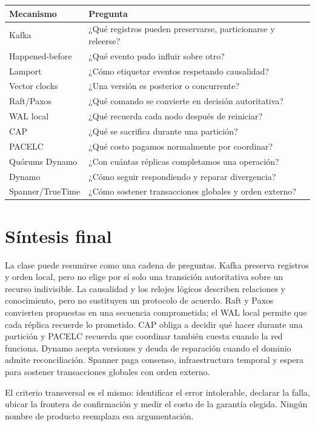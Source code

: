 \documentclass[variant=apuntes,cover=institutional,mode=screen]{ua-engineering-v6-article}
\begin{document}
\begin{longtable}{p{}p{}}
\toprule
\textbf{Mecanismo} & \textbf{Pregunta}\\
\midrule
Kafka & ¿Qué registros pueden preservarse, particionarse y releerse?\\
Happened-before & ¿Qué evento pudo influir sobre otro?\\
Lamport & ¿Cómo etiquetar eventos respetando causalidad?\\
Vector clocks & ¿Una versión es posterior o concurrente?\\
Raft/Paxos & ¿Qué comando se convierte en decisión autoritativa?\\
WAL local & ¿Qué recuerda cada nodo después de reiniciar?\\
CAP & ¿Qué se sacrifica durante una partición?\\
PACELC & ¿Qué costo pagamos normalmente por coordinar?\\
Quórums Dynamo & ¿Con cuántas réplicas completamos una operación?\\
Dynamo & ¿Cómo seguir respondiendo y reparar divergencia?\\
Spanner/TrueTime & ¿Cómo sostener transacciones globales y orden externo?\\
\bottomrule
\end{longtable}

\section{Síntesis final}

La clase puede resumirse como una cadena de preguntas. Kafka preserva registros y orden local, pero no elige por sí solo una transición autoritativa sobre un recurso indivisible. La causalidad y los relojes lógicos describen relaciones y conocimiento, pero no sustituyen un protocolo de acuerdo. Raft y Paxos convierten propuestas en una secuencia comprometida; el WAL local permite que cada réplica recuerde lo prometido. CAP obliga a decidir qué hacer durante una partición y PACELC recuerda que coordinar también cuesta cuando la red funciona. Dynamo acepta versiones y deuda de reparación cuando el dominio admite reconciliación. Spanner paga consenso, infraestructura temporal y espera para sostener transacciones globales con orden externo.

El criterio transversal es el mismo: identificar el error intolerable, declarar la falla, ubicar la frontera de confirmación y medir el costo de la garantía elegida. Ningún nombre de producto reemplaza esa argumentación.
\end{document}
